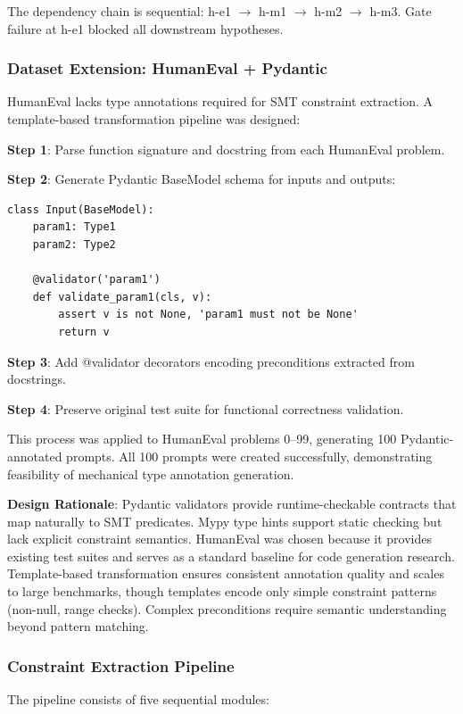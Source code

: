 The dependency chain is sequential: h-e1 $\rightarrow$ h-m1 $\rightarrow$ h-m2 $\rightarrow$ h-m3. Gate failure at h-e1 blocked all downstream hypotheses.

\subsubsection{Dataset Extension: HumanEval + Pydantic}

HumanEval lacks type annotations required for SMT constraint extraction. A template-based transformation pipeline was designed:

\textbf{Step 1}: Parse function signature and docstring from each HumanEval problem.

\textbf{Step 2}: Generate Pydantic BaseModel schema for inputs and outputs:
\begin{verbatim}
class Input(BaseModel):
    param1: Type1
    param2: Type2
    
    @validator('param1')
    def validate_param1(cls, v):
        assert v is not None, 'param1 must not be None'
        return v
\end{verbatim}

\textbf{Step 3}: Add @validator decorators encoding preconditions extracted from docstrings.

\textbf{Step 4}: Preserve original test suite for functional correctness validation.

This process was applied to HumanEval problems 0--99, generating 100 Pydantic-annotated prompts. All 100 prompts were created successfully, demonstrating feasibility of mechanical type annotation generation.

\textbf{Design Rationale}: Pydantic validators provide runtime-checkable contracts that map naturally to SMT predicates. Mypy type hints support static checking but lack explicit constraint semantics. HumanEval was chosen because it provides existing test suites and serves as a standard baseline for code generation research. Template-based transformation ensures consistent annotation quality and scales to large benchmarks, though templates encode only simple constraint patterns (non-null, range checks). Complex preconditions require semantic understanding beyond pattern matching.

\subsubsection{Constraint Extraction Pipeline}

The pipeline consists of five sequential modules:

